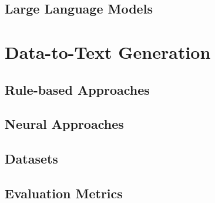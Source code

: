 \subsection{Large Language Models}
\label{sec:llms}
\section{Data-to-Text Generation}
\label{sec:d2t}
\subsection{Rule-based Approaches}
\label{sec:rule-d2t}
\subsection{Neural Approaches}
\label{sec:neural-d2t}
\subsection{Datasets}
\label{sec:datasets}
\subsection{Evaluation Metrics}
\label{sec:evaluation}